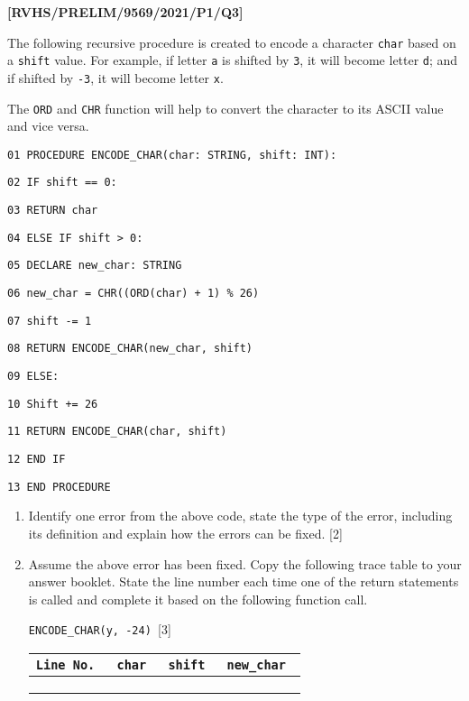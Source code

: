 \item \textbf{{[}RVHS/PRELIM/9569/2021/P1/Q3{]} }

The following recursive procedure is created to encode a character
\texttt{char} based on a \texttt{shift} value. For example, if letter
\textquotedbl\texttt{a}\textquotedbl{} is shifted by \texttt{3},
it will become letter \textquotedbl\texttt{d}\textquotedbl ; and
if shifted by \texttt{-3}, it will become letter \textquotedbl\texttt{x}\textquotedbl . 

The \texttt{ORD} and \texttt{CHR} function will help to convert the
character to its ASCII value and vice versa.

\noindent\begin{minipage}[t]{1\columnwidth}%
\texttt{01 PROCEDURE ENCODE\_CHAR(char: STRING, shift: INT): }

\texttt{02 \qquad{}IF shift == 0: }

\texttt{03 \qquad{}\qquad{}RETURN char }

\texttt{04 \qquad{}ELSE IF shift > 0: }

\texttt{05 \qquad{}\qquad{}DECLARE new\_char: STRING }

\texttt{06 \qquad{}\qquad{}new\_char = CHR((ORD(char) + 1) \% 26) }

\texttt{07 \qquad{}\qquad{}shift -= 1 }

\texttt{08 \qquad{}\qquad{}RETURN ENCODE\_CHAR(new\_char, shift) }

\texttt{09 \qquad{}ELSE: }

\texttt{10 \qquad{}\qquad{}Shift += 26 }

\texttt{11 \qquad{}\qquad{}RETURN ENCODE\_CHAR(char, shift) }

\texttt{12 \qquad{}END IF }

\texttt{13 END PROCEDURE}%
\end{minipage} 
\begin{enumerate}
\item Identify one error from the above code, state the type of the error,
including its definition and explain how the errors can be fixed.
\hfill{}{[}2{]}
\item Assume the above error has been fixed. Copy the following trace table
to your answer booklet. State the line number each time one of the
return statements is called and complete it based on the following
function call. 

\texttt{ENCODE\_CHAR(\textquotedbl y\textquotedbl , -24) }\hfill{}{[}3{]}
\noindent \begin{center}
\begin{tabular}{|c|c|c|c|}
\hline 
\texttt{Line No. } & \texttt{char } & \texttt{shift } & \texttt{new\_char }\tabularnewline
\hline 
 &  &  & \tabularnewline
\hline 
 &  &  & \tabularnewline
\hline 
 &  &  & \tabularnewline
\hline 
\end{tabular}
\par\end{center}

\end{enumerate}